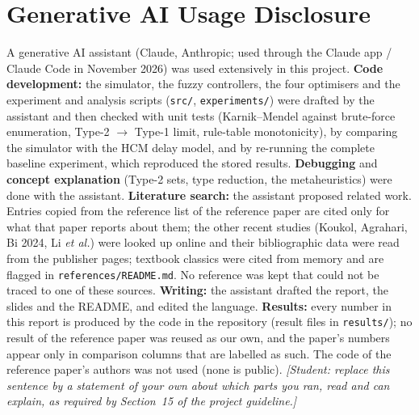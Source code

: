 \section*{Generative AI Usage Disclosure}
A generative AI assistant (Claude, Anthropic; used through the Claude app / Claude Code in November 2026) was used extensively in this project.
\textbf{Code development:} the simulator, the fuzzy controllers, the four optimisers and the experiment and analysis scripts (\texttt{src/}, \texttt{experiments/}) were drafted by the assistant and then checked with
unit tests (Karnik--Mendel against brute-force enumeration, Type-2 $\to$ Type-1 limit, rule-table monotonicity), by comparing the simulator with the HCM delay model, and by re-running the complete baseline experiment, which reproduced the stored results.
\textbf{Debugging} and \textbf{concept explanation} (Type-2 sets, type reduction, the metaheuristics) were done with the assistant.
\textbf{Literature search:} the assistant proposed related work. Entries copied from the reference list of the reference paper are cited only for what that paper reports about them;
the other recent studies (Koukol, Agrahari, Bi 2024, Li \emph{et al.}) were looked up online and their bibliographic data were read from the publisher pages; textbook classics were cited from memory and are flagged in \texttt{references/README.md}.
No reference was kept that could not be traced to one of these sources.
\textbf{Writing:} the assistant drafted the report, the slides and the README, and edited the language.
\textbf{Results:} every number in this report is produced by the code in the repository (result files in \texttt{results/}); no result of the reference paper was reused as our own, and the paper's numbers appear only in
comparison columns that are labelled as such. The code of the reference paper's authors was not used (none is public).
\emph{[Student: replace this sentence by a statement of your own about which parts you ran, read and can explain, as required by Section~15 of the project guideline.]}
